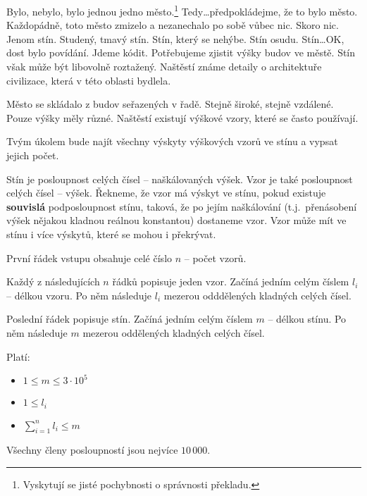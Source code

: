





Bylo, nebylo, bylo jednou jedno město.\footnote{Vyskytují se jisté pochybnosti o správnosti překladu.}
Tedy\dots předpokládejme, že to bylo město.
Každopádně, toto město zmizelo a nezanechalo po sobě vůbec nic.
Skoro nic. Jenom stín. Studený, tmavý stín.
Stín, který se nehýbe. Stín osudu.
Stín\dots OK, dost bylo povídání.
Jdeme kódit.
Potřebujeme zjistit výšky budov ve městě.
Stín však může být libovolně roztažený.
Naštěstí známe detaily o architektuře civilizace, která v této oblasti bydlela.

Město se skládalo z budov seřazených v řadě.
Stejně široké, stejně vzdálené. Pouze výšky měly různé.
Naštěstí existují výškové vzory, které se často používají.

Tvým úkolem bude najít všechny výskyty výškových vzorů ve stínu a vypsat jejich počet.


Stín je posloupnost celých čísel -- naškálovaných výšek.
Vzor je také posloupnost celých čísel -- výšek.
Řekneme, že vzor má výskyt ve stínu,
pokud existuje \textbf{souvislá} podposloupnost stínu,
taková, že po jejím naškálování (t.j.\ přenásobení výšek nějakou kladnou reálnou konstantou) dostaneme vzor.
Vzor může mít ve stínu i více výskytů, které se mohou i překrývat.


První řádek vstupu obsahuje celé číslo $n$
-- počet vzorů.

Každý z následujících $n$ řádků popisuje jeden vzor.
Začíná jedním celým číslem $l_i$ -- délkou vzoru.
Po něm následuje $l_i$ mezerou odddělených kladných celých čísel.

Poslední řádek popisuje stín.
Začíná jedním celým číslem $m$ -- délkou stínu.
Po něm následuje $m$ mezerou oddělených kladných celých čísel.

\bigskip

\noindent
Platí:

\begin{itemize}
  \item $1 \leq m \leq 3\cdot10^5$
  \item $1 \leq l_i$
  \item $\sum^{n}_{i=1} l_i \leq m$
\end{itemize}
Všechny členy posloupností jsou nejvíce $10\,000$.

